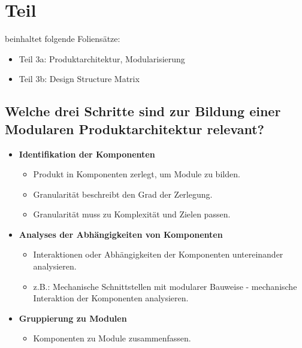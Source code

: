 \section{Teil}
beinhaltet folgende Foliensätze:

\begin{itemize}
    \item Teil 3a:  Produktarchitektur, Modularisierung
    \item Teil 3b:  Design Structure Matrix

\end{itemize}

\subsection{Welche drei Schritte sind zur Bildung einer Modularen Produktarchitektur relevant?}

\begin{itemize}
    \item \textbf{Identifikation der Komponenten}
        \begin{itemize}
            \item Produkt in Komponenten zerlegt, um Module zu bilden.
            \item Granularität beschreibt den Grad der Zerlegung.
            \item Granularität muss zu Komplexität und Zielen passen.
        \end{itemize}
    \item \textbf{Analyses der Abhängigkeiten von Komponenten}
        \begin{itemize}
            \item Interaktionen oder Abhängigkeiten der Komponenten untereinander analysieren.
            \item z.B.: Mechanische Schnittstellen mit modularer Bauweise - mechanische Interaktion der Komponenten analysieren.
        \end{itemize}
    \item \textbf{Gruppierung zu Modulen}
        \begin{itemize}
            \item Komponenten zu Module zusammenfassen.
        \end{itemize}
\end{itemize}

